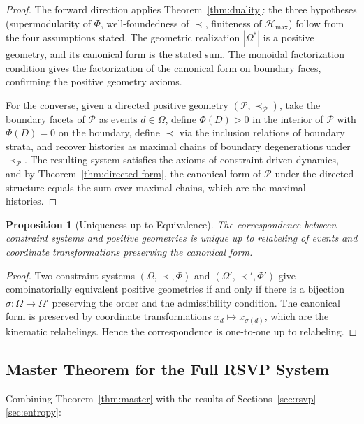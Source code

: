 \documentclass[12pt, oneside]{amsart}
\theoremstyle{plain}
\newtheorem{proposition}[theorem]{Proposition}
\theoremstyle{definition}
\theoremstyle{remark}
\newcommand{\Phif}{\Phi}
\newcommand{\OmKS}{\Omega}
\newcommand{\Hmax}{\mathcal{H}_{\max}}
\begin{document}
\begin{proof}
The forward direction applies Theorem~\ref{thm:duality}: the three hypotheses (supermodularity of $\Phif$, well-foundedness of $\prec$, finiteness of $\Hmax$) follow from the four assumptions stated. The geometric realization $|\OmKS^*|$ is a positive geometry, and its canonical form is the stated sum. The monoidal factorization condition gives the factorization of the canonical form on boundary faces, confirming the positive geometry axioms.

For the converse, given a directed positive geometry $(\mathcal{P}, \prec_{\mathcal{P}})$, take the boundary facets of $\mathcal{P}$ as events $d \in \OmKS$, define $\Phif(D) > 0$ in the interior of $\mathcal{P}$ with $\Phif(D) = 0$ on the boundary, define $\prec$ via the inclusion relations of boundary strata, and recover histories as maximal chains of boundary degenerations under $\prec_{\mathcal{P}}$. The resulting system satisfies the axioms of constraint-driven dynamics, and by Theorem~\ref{thm:directed-form}, the canonical form of $\mathcal{P}$ under the directed structure equals the sum over maximal chains, which are the maximal histories.
\end{proof}

\begin{proposition}[Uniqueness up to Equivalence]
The correspondence between constraint systems and positive geometries is unique up to relabeling of events and coordinate transformations preserving the canonical form.
\end{proposition}

\begin{proof}
Two constraint systems $(\OmKS, \prec, \Phif)$ and $(\OmKS', \prec', \Phif')$ give combinatorially equivalent positive geometries if and only if there is a bijection $\sigma: \OmKS \to \OmKS'$ preserving the order and the admissibility condition. The canonical form is preserved by coordinate transformations $x_d \mapsto x_{\sigma(d)}$, which are the kinematic relabelings. Hence the correspondence is one-to-one up to relabeling.
\end{proof}

\subsection{Master Theorem for the Full RSVP System}

Combining Theorem~\ref{thm:master} with the results of Sections~\ref{sec:rsvp}--\ref{sec:entropy}:
\end{document}
